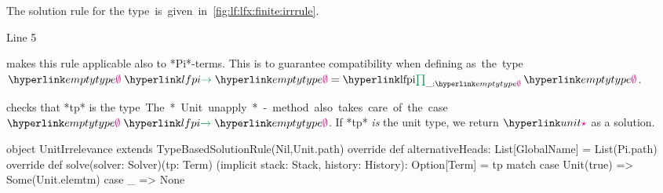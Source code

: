 \begin{example}
	The solution rule for the \unit type is given in \autoref{fig:lf:lfx:finite:irrrule}.
	\begin{labeling}{Line 5}
	\item[Line 2] makes this rule applicable also to *Pi*-terms. This is to guarantee compatibility when defining \unit as the type $\lfarrow\emptytype\emptytype = \lfpi{\_:\emptytype}\emptytype$.
	\item[Line 5] checks that *tp* is the \unit type. The *Unit.unapply*-method also takes care of the case $\lfarrow\emptytype\emptytype$.
		If *tp* \emph{is} the unit type, we return $\unite$ as a solution.
\end{labeling}
	
		\begin{nscalacode}[label=fig:lf:lfx:finite:irrrule,caption={The solution rule for \unitnolink\protect\footnotemark},emph={Pi,Unit}]
object UnitIrrelevance extends TypeBasedSolutionRule(Nil,Unit.path) {
  override def alternativeHeads: List[GlobalName] = List(Pi.path)
  override def solve(solver: Solver)(tp: Term)
      (implicit stack: Stack, history: History): Option[Term] = tp match {
    case Unit(true) => Some(Unit.elemtm)
    case _ => None
  }
}
	\end{nscalacode}
\end{example}

